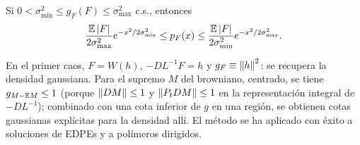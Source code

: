 \begin{corolario}
Si $0<\sigma^2_{\min}\le g_F(F)\le\sigma^2_{\max}$ c.s., entonces
\[
  \frac{\mathbb{E}\left\lvert F\right\rvert}{2\sigma^2_{\max}}e^{-x^2/2\sigma^2_{\min}}\le p_F(x)\le\frac{\mathbb{E}\left\lvert F\right\rvert}{2\sigma^2_{\min}}e^{-x^2/2\sigma^2_{\max}}.
\]
\end{corolario}

\begin{ejemplo}
En el primer caos, $F=W(h)$, $-DL^{-1}F=h$ y $g_F\equiv\left\lVert h\right\rVert^2$: se recupera la
densidad gaussiana. Para el supremo $M$ del browniano, centrado, se tiene $g_{M-\mathbb{E} M}\le1$ (porque
$\left\lVert DM\right\rVert\le1$ y $\left\lVert P_tDM\right\rVert\le1$ en la representación integral de $-DL^{-1}$); combinado con una cota
inferior de $g$ en una región, se obtienen cotas gaussianas explícitas para la densidad allí. El
método se ha aplicado con éxito a soluciones de EDPEs y a polímeros dirigidos.
\end{ejemplo}
